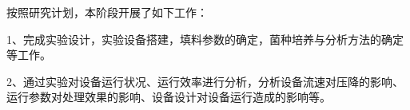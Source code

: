 按照研究计划，本阶段开展了如下工作：\par
1、完成实验设计，实验设备搭建，填料参数的确定，菌种培养与分析方法的确定等工作。\par
2、通过实验对设备运行状况、运行效率进行分析，分析设备流速对压降的影响、运行参数对处理效果的影响、设备设计对设备运行造成的影响等。\par
